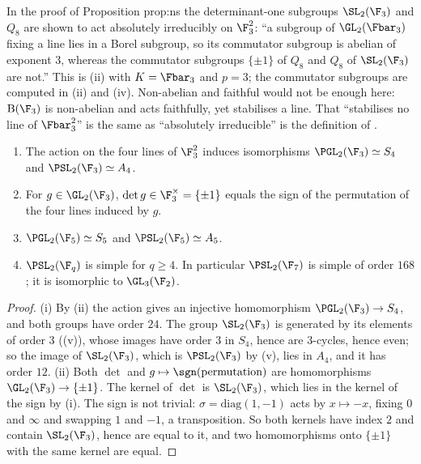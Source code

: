 \begin{paperlink}
In the proof of Proposition prop:ns the determinant-one subgroups $\SL_2(\F_3)$ and $Q_8$ are shown to act absolutely irreducibly on $\F_3^2$: ``a subgroup
of $\GL_2(\Fbar_3)$ fixing a line lies in a Borel subgroup, so its commutator subgroup is abelian of exponent $3$, whereas the commutator subgroups $\{\pm1\}$ of
$Q_8$ and $Q_8$ of $\SL_2(\F_3)$ are not.'' This is (ii) with $K=\Fbar_3$ and $p=3$; the commutator subgroups are computed in
(ii) and (iv). Non-abelian and faithful would not be enough here: $\mathrm B(\F_3)$ is non-abelian and acts faithfully, yet stabilises a line. That ``stabilises no line of $\Fbar_3^2$'' is the same as ``absolutely
irreducible'' is the definition of .
\end{paperlink}

\begin{theorem}\label{thm:groups:smallpgl}
\begin{enumerate}[label=(\roman*)]
\item The action on the four lines of $\F_3^2$ induces isomorphisms $\PGL_2(\F_3)\simeq S_4$ and $\PSL_2(\F_3)\simeq A_4$.
\item For $g\in\GL_2(\F_3)$, $\det g\in\F_3^\times=\{\pm1\}$ equals the sign of the permutation of the four lines induced by $g$.
\item $\PGL_2(\F_5)\simeq S_5$ and $\PSL_2(\F_5)\simeq A_5$.
\item $\PSL_2(\F_q)$ is simple for $q\ge4$. In particular $\PSL_2(\F_7)$ is simple of order $168$; it is isomorphic to $\GL_3(\F_2)$.
\end{enumerate}
\end{theorem}

\begin{proof}
(i) By (ii) the action gives an injective homomorphism $\PGL_2(\F_3)\to S_4$, and both groups have order $24$. The group $\SL_2(\F_3)$
is generated by its elements of order $3$ ((v)), whose images have order $3$ in $S_4$, hence are $3$-cycles, hence even; so the image
of $\SL_2(\F_3)$, which is $\PSL_2(\F_3)$ by (v), lies in $A_4$, and it has order $12$. (ii) Both $\det$ and $g\mapsto\sgn(\text{permutation})$ are
homomorphisms $\GL_2(\F_3)\to\{\pm1\}$. The kernel of $\det$ is $\SL_2(\F_3)$, which lies in the kernel of the sign by (i). The sign is not trivial: $\sigma=\mathrm{diag}(1,-1)$
acts by $x\mapsto-x$, fixing $0$ and $\infty$ and swapping $1$ and $-1$, a transposition. So both kernels have index $2$ and contain $\SL_2(\F_3)$, hence are equal to it,
and two homomorphisms onto $\{\pm1\}$ with the same kernel are equal.
\end{proof}

